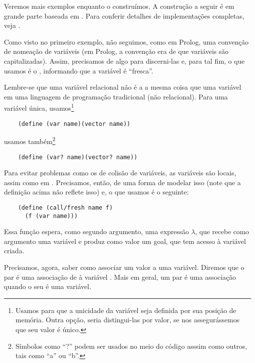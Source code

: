   Veremos mais exemplos enquanto o construímos. A construção a seguir
  é em grande parte baseada em \cite{will}. Para conferir detalhes de
  implementações completas, veja \cite{kanren}.

  Como visto no primeiro exemplo, não seguimos, como em Prolog, uma
  convenção de nomeação de variáveis (em Prolog, a convenção era de
  que variáveis são  capitalizadas). Assim, precisamos de algo para
  discerni-las e, para tal fim, o que usamos é o ,
  informando que a variável é ``fresca''.

  
  Lembre-se que uma variável relacional não é a a mesma
  coisa que uma variável em uma linguagem de programação tradicional
  (não relacional). Para uma variável única, usamos\footnote{Usamos
     para que a unicidade da variável seja definida
    por sua posição de memória. Outra opção, seria distingui-las por
    valor, se nos assegurássemos que seu valor é único.}
  
  \begin{lstlisting}
    (define (var name)(vector name))
  \end{lstlisting}

  \noindent usamos também\footnote{Símbolos como ``?'' podem ser
    usados no meio do código asssim como outros, tais como ``a'' ou ``b''.}

  \begin{lstlisting}
    (define (var? name)(vector? name))
  \end{lstlisting}

  Para evitar problemas como os de colisão de variáveis, as variáveis
  são locais, assim como em . Precisamos, então, de
  uma forma de modelar isso (note que a definição acima não reflete
  isso) e, o que usamos é o seguinte:

  \begin{lstlisting}
    (define (call/fresh name f)
      (f (var name)))
  \end{lstlisting}

  Essa função espera, como segundo argumento, uma expressão $\lambda$, que
  recebe como argumento uma variável e produz como valor um goal, que
  tem acesso à variável criada.
  
  Precisamos, agora, saber como associar um valor a uma
  variável. Diremos que o par  é uma associação de
   à variável . Mais em geral, um par é uma
  associação quando o seu  é uma variável.

